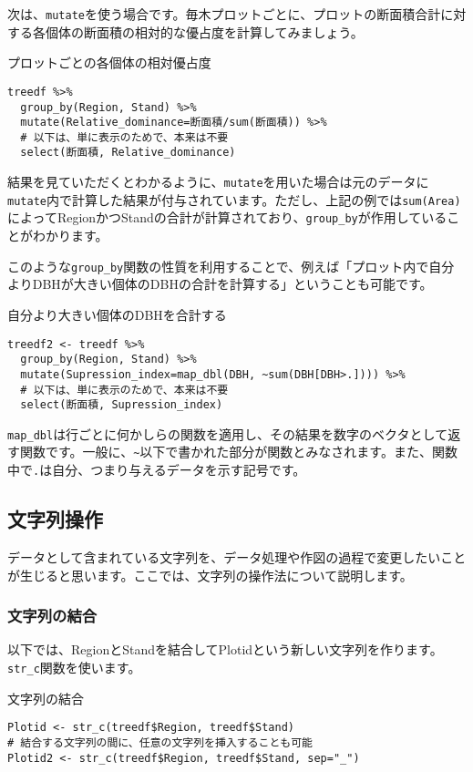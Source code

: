 次は、\verb|mutate|を使う場合です。毎木プロットごとに、プロットの断面積合計に対する各個体の断面積の相対的な優占度を計算してみましょう。
\begin{itembox}[l]{プロットごとの各個体の相対優占度}
\begin{verbatim}
treedf %>%
  group_by(Region, Stand) %>%
  mutate(Relative_dominance=断面積/sum(断面積)) %>%
  # 以下は、単に表示のためで、本来は不要
  select(断面積, Relative_dominance)
\end{verbatim}
\end{itembox}

結果を見ていただくとわかるように、\verb|mutate|を用いた場合は元のデータに\verb|mutate|内で計算した結果が付与されています。ただし、上記の例では\verb|sum(Area)|によってRegionかつStandの合計が計算されており、\verb|group_by|が作用していることがわかります。

このような\verb|group_by|関数の性質を利用することで、例えば「プロット内で自分よりDBHが大きい個体のDBHの合計を計算する」ということも可能です。
\begin{itembox}[l]{自分より大きい個体のDBHを合計する}
\begin{verbatim}
treedf2 <- treedf %>%
  group_by(Region, Stand) %>%
  mutate(Supression_index=map_dbl(DBH, ~sum(DBH[DBH>.]))) %>%
  # 以下は、単に表示のためで、本来は不要
  select(断面積, Supression_index)
\end{verbatim}
\end{itembox}
\verb|map_dbl|は行ごとに何かしらの関数を適用し、その結果を数字のベクタとして返す関数です。一般に、\verb|~|以下で書かれた部分が関数とみなされます。また、関数中で\verb|.|は自分、つまり与えるデータを示す記号です。

  \subsection{文字列操作}
データとして含まれている文字列を、データ処理や作図の過程で変更したいことが生じると思います。ここでは、文字列の操作法について説明します。
    \subsubsection{文字列の結合}
以下では、RegionとStandを結合してPlotidという新しい文字列を作ります。\verb|str_c|関数を使います。
\begin{itembox}[l]{文字列の結合}
\begin{verbatim}
Plotid <- str_c(treedf$Region, treedf$Stand)
# 結合する文字列の間に、任意の文字列を挿入することも可能
Plotid2 <- str_c(treedf$Region, treedf$Stand, sep="_")
\end{verbatim}
\end{itembox}

